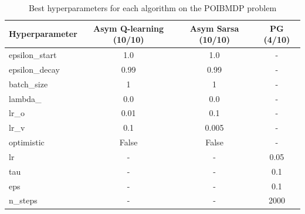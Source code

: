 \begin{table}
    \centering
    \begin{tabular}{|l|c|c|c|}
    \textbf{Hyperparameter} & \textbf{Asym Q-learning (10/10)} & \textbf{Asym Sarsa (10/10)} & \textbf{PG (4/10)} \\
    \toprule
    epsilon\_start & 1.0 & 1.0 & - \\
    epsilon\_decay & 0.99 & 0.99 & - \\
    batch\_size & 1 & 1 & - \\
    lambda\_ & 0.0 & 0.0 & - \\
    lr\_o & 0.01 & 0.1 & - \\
    lr\_v & 0.1 & 0.005 & - \\
    optimistic & False & False & - \\
    lr & - & - & 0.05 \\
    tau & - & - & 0.1 \\
    eps & - & - & 0.1 \\
    n\_steps & - & - & 2000 \\
    \bottomrule
    \end{tabular}
    \caption{Best hyperparameters for each algorithm on the POIBMDP problem}
    \label{tab:algorithm-hyperparameters}
    \end{table}

